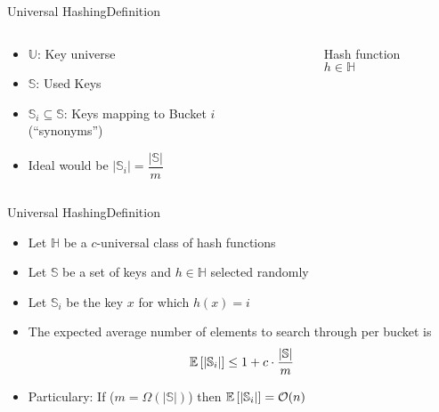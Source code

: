 \begin{frame}{Universal Hashing}{Definition}
  \begin{columns}
    \begin{column}{0.5\linewidth}
      \begin{itemize}
        \item
          {\color{MainA}$\mathbb{U}$}:
          Key universe
        \item
          {\color{MainA}$\mathbb{S}$}:
          Used Keys
        \item
          {\color{MainA}$\mathbb{S}_i \subseteq \mathbb{S}$}:
          Keys mapping to Bucket {\color{MainA}$i$} (\enquote{synonyms})
       \item
         Ideal would be
         {\color{MainA}$\vert \mathbb{S}_i \vert =\dfrac{\vert \mathbb{S} \vert}{m}$}
      \end{itemize}
    \end{column}
    \begin{column}{0.5\linewidth}
      \begin{figure}[!h]%
        \begin{adjustbox}{width=\linewidth}%
        \end{adjustbox}
        \caption{Hash function {\color{MainA}$h \in \mathbb{H}$}}%
        \label{fig:universal_hashing:hash_function_to_bucket}
      \end{figure}
    \end{column}
  \end{columns}
\end{frame}


\begin{frame}{Universal Hashing}{Definition}
  \begin{itemize}
    \item<1->
      Let {\color{MainA}$\mathbb{H}$} be a {\color{MainA}$c$}-universal class of hash functions
    \item<2->
      Let {\color{MainA}$\mathbb{S}$} be a set of keys and {\color{MainA}$h \in \mathbb{H}$} selected randomly
    \item<3->
      Let {\color{MainA}$\mathbb{S}_i$} be the key {\color{MainA}$x$} for which {\color{MainA}$h(x) = i$}
    \item<4->
      The expected average number of elements to search through per 
      bucket is {\color{MainA}\[\mathbb{E}{}\left[\vert \mathbb{S}_i \vert\right]
        \leq 1 + c \cdot \frac{\vert \mathbb{S} \vert}{m}\]}
    \item<5->
      Particulary: If  {\color{MainA}($m = \Omega(\vert \mathbb{S} \vert)$)} then
      {\color{MainA}$\mathbb{E}{}\left[\vert \mathbb{S}_i \vert\right] = \mathcal{O}(n)$}
  \end{itemize}
\end{frame}
